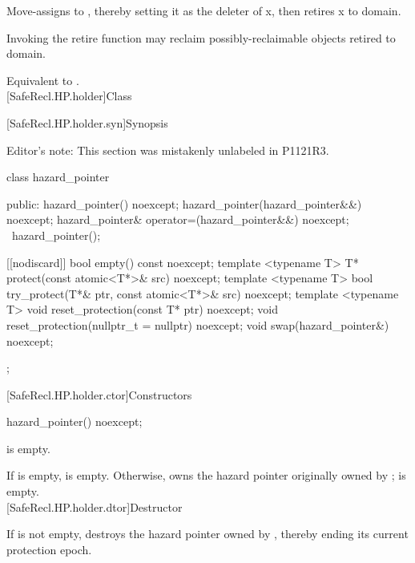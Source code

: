 \pnum
\effects Move-assigns  to , thereby setting it as the deleter of x, then retires x
to domain.

\pnum
Invoking the retire function may reclaim possibly-reclaimable objects retired to domain.
\\


\pnum
\effects Equivalent to .
\\

[SafeRecl.HP.holder]{Class }

[SafeRecl.HP.holder.syn]{Synopsis}

Editor's note: This section was mistakenly unlabeled in P1121R3.

\begin{codeblock}
class hazard_pointer {
public:
  hazard_pointer() noexcept;
  hazard_pointer(hazard_pointer&&) noexcept;
  hazard_pointer& operator=(hazard_pointer&&) noexcept;
  ~hazard_pointer();
  
  [[nodiscard]] bool empty() const noexcept;
  template <typename T> T* protect(const atomic<T*>& src) noexcept;  
  template <typename T> bool try_protect(T*& ptr, const atomic<T*>& src) noexcept;
  template <typename T> void reset_protection(const T* ptr) noexcept;
  void reset_protection(nullptr_t = nullptr) noexcept;
  void swap(hazard_pointer&) noexcept;
};
\end{codeblock}

[SafeRecl.HP.holder.ctor]{Constructors}
\begin{itemdecl}
hazard\_pointer() noexcept;
\end{itemdecl}
\pnum
\postconditions {} is empty.
\\


\pnum
\postconditions If  is empty,  is empty. Otherwise,  owns the hazard pointer originally owned by ;  is empty.
\\

[SafeRecl.HP.holder.dtor]{Destructor}


\pnum
\effects If  is not empty, destroys the hazard pointer owned by , thereby ending its current protection epoch.
\\

